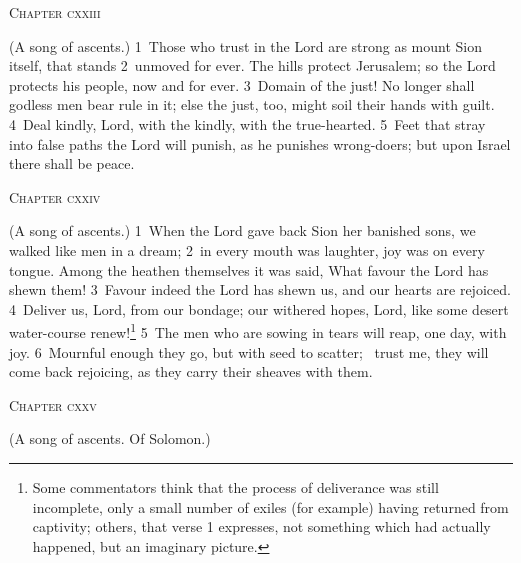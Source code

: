 \documentclass[10pt]{book} %
\begin{document}
\begin{large}\begin{center}\textsc{Chapter cxxiii}\end{center}\end{large}
(A song of ascents.)
\textcolor{benred8}{1}~Those who trust in the Lord are strong as mount Sion itself, that stands \textcolor{benred8}{2}~unmoved for ever. The hills protect Jerusalem; so the Lord protects his people, now and for ever. \textcolor{benred8}{3}~Domain of the just! No longer shall godless men bear rule in it; else the just, too, might soil their hands with guilt. \textcolor{benred8}{4}~Deal kindly, Lord, with the kindly, with the true-hearted. \textcolor{benred8}{5}~Feet that stray into false paths the Lord will punish, as he punishes wrong-doers; but upon Israel there shall be peace.
\begin{large}\begin{center}\textsc{Chapter cxxiv}\end{center}\end{large}
(A song of ascents.)
\textcolor{benred8}{1}~When the Lord gave back Sion her banished sons, we walked like men in a dream; \textcolor{benred8}{2}~in every mouth was laughter, joy was on every tongue. Among the heathen themselves it was said, What favour the Lord has shewn them! \textcolor{benred8}{3}~Favour indeed the Lord has shewn us, and our hearts are rejoiced. \textcolor{benred8}{4}~Deliver us, Lord, from our bondage; our withered hopes, Lord, like some desert water-course renew!\footnote[1]{Some commentators think that the process of deliverance was still incomplete, only a small number of exiles (for example) having returned from captivity; others, that verse 1 expresses, not something which had actually happened, but an imaginary picture.} \textcolor{benred8}{5}~The men who are sowing in tears will reap, one day, with joy. \textcolor{benred8}{6}~Mournful enough they go, but with seed to scatter; ~trust me, they will come back rejoicing, as they carry their sheaves with them.
\begin{large}\begin{center}\textsc{Chapter cxxv}\end{center}\end{large}
(A song of ascents. Of Solomon.)
\end{document}
